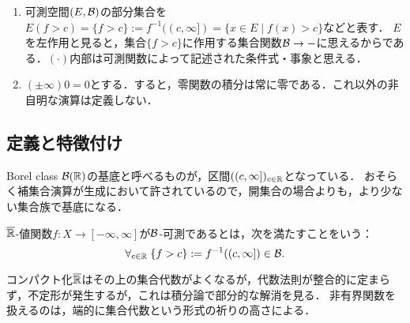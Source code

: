 \documentclass[uplatex, dvipdfmx]{jsreport}
\begin{document}
\begin{notation}\mbox{}
    \begin{enumerate}
        \item 可測空間$(E,\mathcal{B})$の部分集合を
        $E(f>c)=\{f>c\}:=f^{-1}((c,\infty])=\{x\in E\mid f(x)>c\}$などと表す．
        $E$を左作用と見ると，集合$\{f>c\}$に作用する集合関数$\mathcal{B}\to-$に思えるからである．$(\cdot)$内部は可測関数によって記述された条件式・事象と思える．
        \item $(\pm\infty)0=0$とする．すると，零関数の積分は常に零である．これ以外の非自明な演算は定義しない．
    \end{enumerate}
\end{notation}

\subsection{定義と特徴付け}

\begin{tcolorbox}[colframe=ForestGreen, colback=ForestGreen!10!white,breakable,colbacktitle=ForestGreen!40!white,coltitle=black,fonttitle=\bfseries\sffamily,
title=]
    Borel class $\mathcal{B}(\mathbb{R})$の基底と呼べるものが，区間$((c,\infty])_{c\in\mathbb{R}}$となっている．
    おそらく補集合演算が生成において許されているので，開集合の場合よりも，より少ない集合族で基底になる．
\end{tcolorbox}

\begin{definition}
    $\overline{\mathbb{R}}$-値関数$f:X\to[-\infty,\infty]$が$\mathcal{B}$-可測であるとは，次を満たすことをいう：
    \[\forall_{c\in\mathbb{R}}\;\{f>c\}:=f^{-1}((c,\infty])\in\mathcal{B}.\]
\end{definition}
\begin{remarks}
    コンパクト化$\overline{\mathbb{R}}$はその上の集合代数がよくなるが，代数法則が整合的に定まらず，不定形が発生するが，これは積分論で部分的な解消を見る．
    非有界関数を扱えるのは，端的に集合代数という形式の祈りの高さによる．
\end{remarks}
\end{document}
